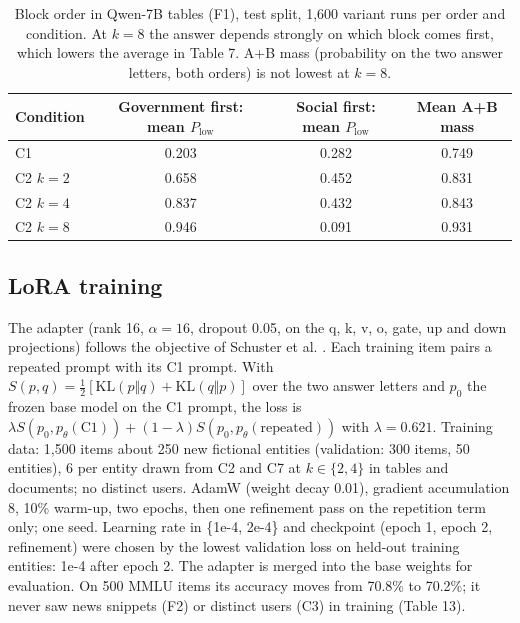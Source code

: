 \begin{table}[!htbp]\centering\scriptsize\begin{tabular}{@{}lccc@{}}\toprule
Condition & Government first: mean $P_{\text{low}}$ & Social first: mean $P_{\text{low}}$ & Mean A+B mass \\ \midrule
C1 & 0.203 & 0.282 & 0.749 \\
C2 $k{=}2$ & 0.658 & 0.452 & 0.831 \\
C2 $k{=}4$ & 0.837 & 0.432 & 0.843 \\
C2 $k{=}8$ & 0.946 & 0.091 & 0.931 \\
\bottomrule\end{tabular}\caption{Block order in Qwen-7B tables (F1), test split, 1,600 variant runs per order and condition. At $k{=}8$ the answer depends strongly on which block comes first, which lowers the average in Table 7. A+B mass (probability on the two answer letters, both orders) is not lowest at $k{=}8$.}\label{tab:order}\end{table}

\subsection*{LoRA training}
The adapter (rank 16, $\alpha=16$, dropout 0.05, on the q, k, v, o, gate, up and down projections) follows the objective of Schuster et al. \citep{schuster2026whose}. Each training item pairs a repeated prompt with its C1 prompt. With $S(p,q)=\tfrac12[\mathrm{KL}(p\Vert q)+\mathrm{KL}(q\Vert p)]$ over the two answer letters and $p_0$ the frozen base model on the C1 prompt, the loss is $\lambda S(p_0, p_\theta(\text{C1})) + (1-\lambda) S(p_0, p_\theta(\text{repeated}))$ with $\lambda = 0.621$. Training data: 1,500 items about 250 new fictional entities (validation: 300 items, 50 entities), 6 per entity drawn from C2 and C7 at $k \in \{2,4\}$ in tables and documents; no distinct users. AdamW (weight decay 0.01), gradient accumulation 8, 10\% warm-up, two epochs, then one refinement pass on the repetition term only; one seed. Learning rate in \{1e-4, 2e-4\} and checkpoint (epoch 1, epoch 2, refinement) were chosen by the lowest validation loss on held-out training entities: 1e-4 after epoch 2. The adapter is merged into the base weights for evaluation. On 500 MMLU items its accuracy moves from 70.8\% to 70.2\%; it never saw news snippets (F2) or distinct users (C3) in training (Table 13).

